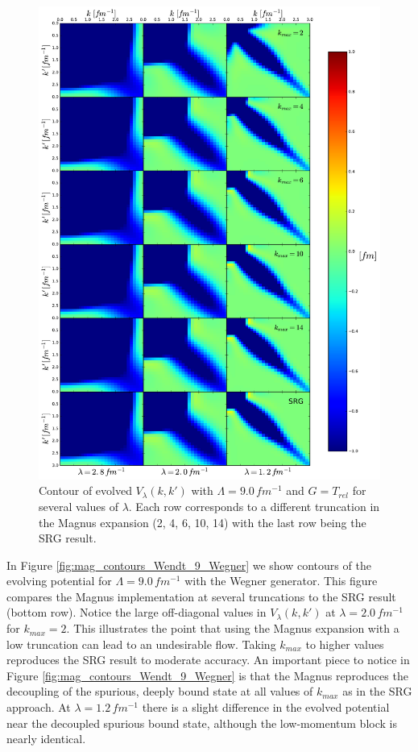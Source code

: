 \documentclass[preprintnumbers,floatfix,aps,prc,preprint]{revtex4-1}
\begin{document}
\begin{figure}[H]
  \centering
  \includegraphics[width=15cm]{mag_contours_Wendt_9_Wilson}
   \hspace*{0.05\textwidth}%
  \caption{Contour of evolved $V_{\lambda}(k,k')$ with $\Lambda=9.0\,fm^{-1}$ and $G=T_{rel}$ for several values of $\lambda$. Each row corresponds to a different truncation in the Magnus expansion (2, 4, 6, 10, 14) with the last row being the SRG result.}
  \label{fig:mag_contours_Wendt_9_Wilson}
\end{figure}
%
In Figure \ref{fig:mag_contours_Wendt_9_Wegner} we show contours of the evolving potential for $\Lambda=9.0 \, fm^{-1}$ with the Wegner generator. This figure compares the Magnus implementation at several truncations to the SRG result (bottom row). Notice the large off-diagonal values in $V_{\lambda}(k,k')$ at $\lambda=2.0 \, fm^{-1}$ for $k_{max}=2$. This illustrates the point that using the Magnus expansion with a low truncation can lead to an undesirable flow. Taking $k_{max}$ to higher values reproduces the SRG result to moderate accuracy. An important piece to notice in Figure \ref{fig:mag_contours_Wendt_9_Wegner} is that the Magnus reproduces the decoupling of the spurious, deeply bound state at all values of $k_{max}$ as in the SRG approach. At $\lambda=1.2 \, fm^{-1}$ there is a slight difference in the evolved potential near the decoupled spurious bound state, although the low-momentum block is nearly identical.
\end{document}

